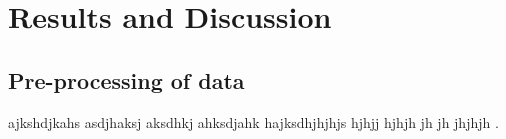 \section{Results and Discussion}

\subsection{Pre-processing of data}
ajkshdjkahs asdjhaksj aksdhkj ahksdjahk hajksdhjhjhjs hjhjj hjhjh jh jh jhjhjh \cite{mitch1}.